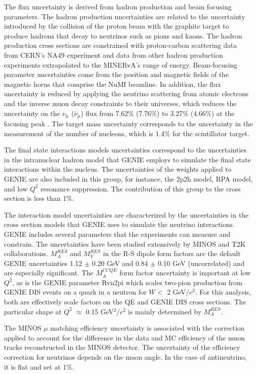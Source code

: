 \documentclass[aps, prd, twocolumn, showpacs, superscriptaddress, floatfix]{revtex4-2}
\begin{document}
The flux uncertainty is derived from hadron production and beam focusing parameters. The hadron production uncertainties are related to the uncertainty introduced by the collision of the proton beam with the graphite target to produce hadrons that decay to neutrinos such as pions and kaons. The hadron production cross sections are constrained with proton-carbon scattering data from CERN's NA49 experiment and data from other hadron production experiments \cite{AliagaThesis2016, Adamson2016} extrapolated to the MINERvA's range of energy. Beam-focusing parameter uncertainties come from the position and magnetic fields of the magnetic horns that comprise the NuMI beamline. In addition, the flux uncertainty is reduced by applying the neutrino scattering from atomic electrons and the inverse muon decay constraints to their universes, which reduces the uncertainty on the $\nu_\mu$ ($\bar{\nu}_\mu$) flux from 7.62\% (7.76\%) to 3.27\% (4.66\%) at the focusing peak \cite{Zazueta2023}. The target mass uncertainty corresponds to the uncertainty in the measurement of the number of nucleons, which is 1.4\% for the scintillator target. 

The final state interactions models uncertainties correspond to the uncertainties in the intranuclear hadron model that GENIE employs to simulate the final state interactions within the nucleus. The uncertainties of the weights applied to GENIE are also included in this group, for instance, the 2p2h model, RPA model, and low $Q^2$ resonance suppression. The contribution of this group to the cross section is less than 1\%. 

The interaction model uncertainties are characterized by the uncertainties in the cross section models that GENIE uses to simulate the neutrino interactions. GENIE includes several parameters that the experiments can measure and constrain. The uncertainties have been studied extensively by MINOS and T2K collaborations. $M^{RES}_A$ and $M^{RES}_V$ in the R-S dipole form factors are the default GENIE uncertainties 1.12 $\pm$ 0.20 GeV and 0.84 $\pm$ 0.10 GeV (uncorrelated) and are especially significant. The $M^{CCQE}_A$ form factor uncertainty is important at low $Q^2$, as is the GENIE parameter Rvn2pi which scales two-pion production from GENIE DIS events on a quark in a neutron for $W <$ 2 GeV/$c^2$. For this analysis, both are effectively scale factors on the QE and GENIE DIS cross sections. The particular shape at $Q^2$ $\approx$ 0.15 GeV$^2$/$c^2$ is mainly determined by $M^{RES}_A$.

The MINOS $\mu$ matching efficiency uncertainty is associated with the correction applied to account for the difference in the data and MC efficiency of the muon tracks reconstructed in the MINOS detector. The uncertainty of the efficiency correction for neutrinos depends on the muon angle. In the case of antineutrino, it is flat and set at 1\%. 
\end{document}
